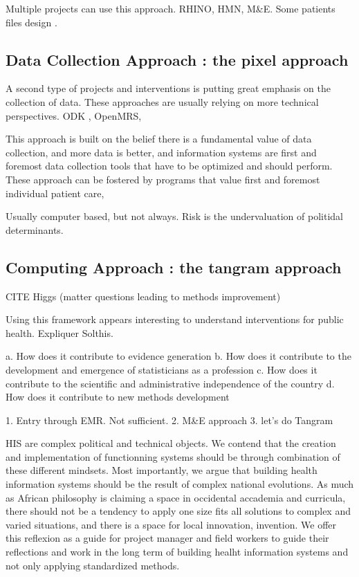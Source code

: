 \documentclass[letterpaper, 10 pt, conference]{IEEEconf}  %
\begin{document}
Multiple projects can use this approach. RHINO, HMN, M\&E. Some patients files design \cite{health_metrics_network_framework_2008, rhino_introducing_2003} .

\subsection{Data Collection Approach : the pixel approach}

A second type of projects and interventions is putting great emphasis on the collection of data. These approaches are usually relying on more technical perspectives. ODK , OpenMRS,

This approach is built on the belief there is a fundamental value of data collection, and more data is better, and information systems are first and foremost data collection tools that have to be optimized and should perform. These approach can be fostered by programs that value first and foremost individual patient care,

Usually computer based, but not always. Risk is the undervaluation of politidal determinants.

\subsection{Computing Approach : the tangram approach}

\cite{wagenaar_using_2016}
CITE Higgs (matter questions leading to methods improvement)






Using this framework appears interesting to understand interventions for public health. Expliquer Solthis.

a. How does it contribute to evidence generation
b. How does it contribute to the development and emergence of statisticians as a profession
c. How does it contribute to the scientific and administrative independence of the country
d. How does it contribute to new methods development


1. Entry through EMR. Not sufficient.
2. M\&E approach
3. let's do Tangram

HIS are complex political and technical objects. We contend that the creation and implementation of functionning systems should be through combination of these different mindsets. Most importantly, we argue that building health information systems should be the result of complex national evolutions. As much as African philosophy is claiming a space in occidental accademia and curricula, there should not be a tendency to apply one size fits all solutions to complex and varied situations, and there is a space for local innovation, invention. We offer this reflexion as a guide for project manager and field workers to guide their reflections and work in the long term of building healht information systems and not only applying standardized methods.
\end{document}
